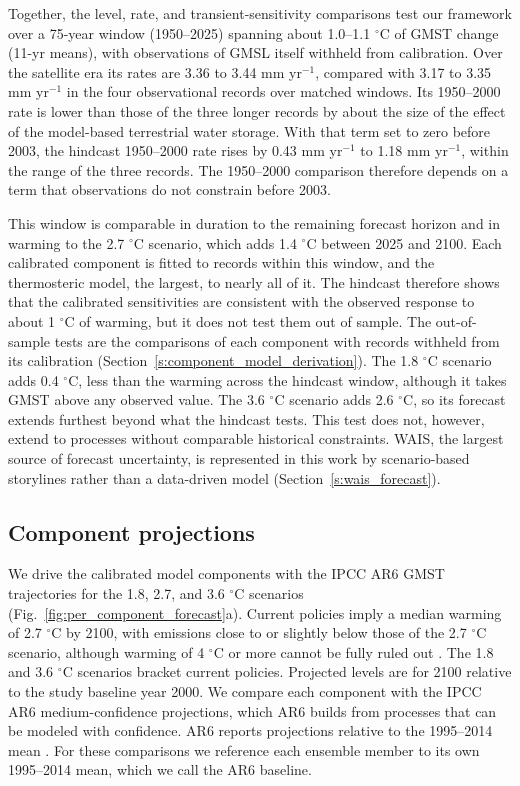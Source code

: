 \documentclass[draft,linenumbers]{agujournal2025}
\begin{document}
Together, the level, rate, and transient-sensitivity comparisons test our framework over a 75-year window (1950--2025) spanning about 1.0--1.1 $^\circ$C of GMST change (11-yr means), with observations of GMSL itself withheld from calibration. Over the satellite era its rates are 3.36 to 3.44 mm yr$^{-1}$, compared with 3.17 to 3.35 mm yr$^{-1}$ in the four observational records over matched windows. Its 1950--2000 rate is lower than those of the three longer records by about the size of the effect of the model-based terrestrial water storage. With that term set to zero before 2003, the hindcast 1950--2000 rate rises by 0.43 mm yr$^{-1}$ to 1.18 mm yr$^{-1}$, within the range of the three records. The 1950--2000 comparison therefore depends on a term that observations do not constrain before 2003. 

This window is comparable in duration to the remaining forecast horizon and in warming to the 2.7 $^\circ$C scenario, which adds 1.4 $^\circ$C between 2025 and 2100. Each calibrated component is fitted to records within this window, and the thermosteric model, the largest, to nearly all of it. The hindcast therefore shows that the calibrated sensitivities are consistent with the observed response to about 1 $^\circ$C of warming, but it does not test them out of sample. The out-of-sample tests are the comparisons of each component with records withheld from its calibration (Section~\ref{s:component_model_derivation}). The 1.8 $^\circ$C scenario adds 0.4 $^\circ$C, less than the warming across the hindcast window, although it takes GMST above any observed value. The 3.6 $^\circ$C scenario adds 2.6 $^\circ$C, so its forecast extends furthest beyond what the hindcast tests. This test does not, however, extend to processes without comparable historical constraints. WAIS, the largest source of forecast uncertainty, is represented in this work by scenario-based storylines rather than a data-driven model (Section~\ref{s:wais_forecast}).

\subsection{Component projections}

We drive the calibrated model components with the IPCC AR6 GMST trajectories for the 1.8, 2.7, and 3.6 $^\circ$C scenarios (Fig.~\ref{fig:per_component_forecast}a). Current policies imply a median warming of 2.7 $^\circ$C by 2100, with emissions close to or slightly below those of the 2.7 $^\circ$C scenario, although warming of 4 $^\circ$C or more cannot be fully ruled out \citep{Hausfather2025}. The 1.8 and 3.6 $^\circ$C scenarios bracket current policies. Projected levels are for 2100 relative to the study baseline year 2000. We compare each component with the IPCC AR6 medium-confidence projections, which AR6 builds from processes that can be modeled with confidence. AR6 reports projections relative to the 1995--2014 mean \citep{Fox-Kemper2021}. For these comparisons we reference each ensemble member to its own 1995--2014 mean, which we call the AR6 baseline.
\end{document}
